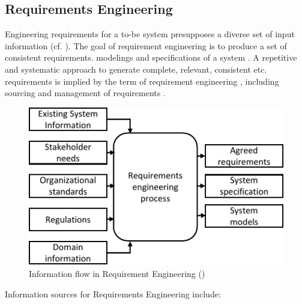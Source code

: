 \subsection{Requirements Engineering \label{ssec:reqEn}}
Engineering requirements for a to-be system presupposes a diverse set of input information (cf. ). The goal of requirement engineering is to produce a set of consistent requirements. modelings and specifications of a system \parencite[cf.][28]{Kotonya.2000}. A repetitive\label{iterative} and systematic approach to generate complete, relevant, consistent etc. requirements is implied by the term of requirement engineering \parencite[5]{Sommerville.2000}, including sourcing and management of requirements \parencite[262]{Pohl.2007}.

\begin{figure}[H]
    \centering
    \includegraphics[scale=1.3]{img/RequirementInformationStream.pdf}
    \caption[Information flow in Requirements Engineering]{Information flow in Requirement Engineering (\protect\cite[28]{Kotonya.2000})}
    \label{fig:reqFlow}
\end{figure}

Information sources for Requirements Engineering include:

